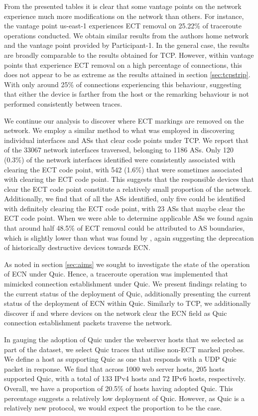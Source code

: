 \documentclass{l4proj}
\begin{document}
From the presented tables it is clear that some vantage points on the network experience much more modifications on the network than others. For instance, the vantage point us-east-1 experiences ECT removal on 25.22\% of traceroute operations conducted. We obtain similar results from the authors home network and the vantage point provided by Participant-1. In the general case, the results are broadly comparable to the results obtained for TCP. However, within vantage points that experience ECT removal on a high percentage of connections, this does not appear to be as extreme as the results attained in section \ref{sec:tcpstrip}. With only around 25\% of connections experiencing this behaviour, suggesting that either the device is farther from the host or the remarking behaviour is not performed consistently between traces.

We continue our analysis to discover where ECT markings are removed on the network. We employ a similar method to what was employed in discovering individual interfaces and ASs that clear code points under TCP. We report that of the 33067 network interfaces traversed, belonging to 1186 ASs. Only 120 (0.3\%) of the network interfaces identified were consistently associated with clearing the ECT code point, with 542 (1.6\%) that were sometimes associated with clearing the ECT code point. This suggests that the responsible devices that clear the ECT code point constitute a relatively small proportion of the network. Additionally, we find that of all the ASs identified, only five could be identified with definitely clearing the ECT code point, with 23 ASs that maybe clear the ECT code point. When we were able to determine applicable ASs we found again that around half 48.5\% of ECT removal could be attributed to AS boundaries, which is slightly lower than what was found by \cite{mcquistin_is_2015}, again suggesting the deprecation of historically destructive devices towards ECN.


As noted in section \ref{sec:aims} we sought to investigate the state of the operation of ECN under Quic. Hence, a traceroute operation was implemented that mimicked connection establishment under Quic. We present findings relating to the current status of the deployment of Quic, additionally presenting the current status of the deployment of ECN within Quic. Similarly to TCP, we additionally discover if and where devices on the network clear the ECN field as Quic connection establishment packets traverse the network.

In gauging the adoption of Quic under the webserver hosts that we selected as part of the dataset, we select Quic traces that utilise non-ECT marked probes. We define a host as supporting Quic as one that responds with a UDP Quic packet in response. We find that across 1000 web server hosts, 205 hosts supported Quic, with a total of 133 IPv4 hosts and 72 IPv6 hosts, respectively. Overall, we have a proportion of 20.5\% of hosts having adopted Quic. This percentage suggests a relatively low deployment of Quic. However, as Quic is a relatively new protocol, we would expect the proportion to be the case.
\end{document}
